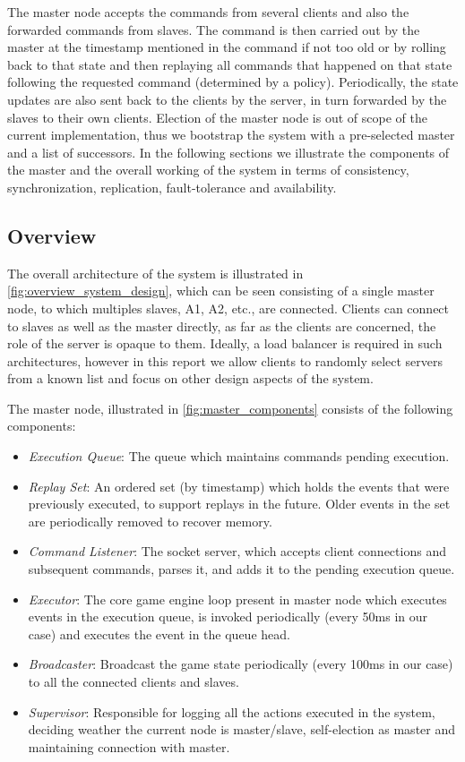 \documentclass[a4paper]{IEEEtran}
\begin{document}
  The master node accepts the commands from several clients and also the forwarded commands from slaves. The command is then carried out by the master at the timestamp mentioned in the command if not too old or by rolling back to that state and then replaying all commands that happened on that state following the requested command (determined by a policy). Periodically, the state updates are also sent back to the clients by the server, in turn forwarded by the slaves to their own clients. Election of the master node is out of scope of the current implementation, thus we bootstrap the system with a pre-selected master and a list of successors. In the following sections we illustrate the components of the master and the overall working of the system in terms of consistency, synchronization, replication, fault-tolerance and availability.

  \subsection{Overview} \label{system_design_overview}
  
  The overall architecture of the system is illustrated in \autoref{fig:overview_system_design}, which can be seen consisting of a single master node, to which multiples slaves, A1, A2, etc., are connected. Clients can connect to slaves as well as the master directly, as far as the clients are concerned, the role of the server is opaque to them. Ideally, a load balancer is required in such architectures, however in this report we allow clients to randomly select servers from a known list and focus on other design aspects of the system. 
  
  The master node, illustrated in \autoref{fig:master_components} consists of the following components:
  
  \begin{itemize}
    \item \emph{Execution Queue}: The queue which maintains commands pending execution.
    \item \emph{Replay Set}: An ordered set (by timestamp) which holds the events that were previously executed, to support replays in the future. Older events in the set are periodically removed to recover memory. 
    \item \emph{Command Listener}: The socket server, which accepts client connections and subsequent commands, parses it, and adds it to the pending execution queue.
    \item \emph{Executor}: The core game engine loop present in master node which executes events in the execution queue, is invoked periodically (every 50ms in our case) and executes the event in the queue head.
    \item \emph{Broadcaster}: Broadcast the game state periodically (every 100ms in our case) to all the connected clients and slaves. 
    \item \emph{Supervisor}: Responsible for logging all the actions executed in the system, deciding weather the current node is master/slave, self-election as master and maintaining connection with master.
  \end{itemize}
\end{document}

